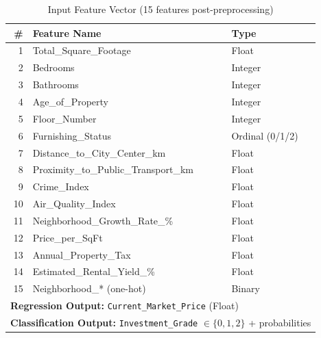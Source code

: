\documentclass[12pt,a4paper]{article}
\begin{document}
\begin{table}[H]
\centering
\caption{Input Feature Vector (15 features post-preprocessing)}
\begin{tabular}{@{} r l l @{}}
\toprule
\textbf{\#} & \textbf{Feature Name} & \textbf{Type} \\
\midrule
1  & Total\_Square\_Footage               & Float \\
2  & Bedrooms                             & Integer \\
3  & Bathrooms                            & Integer \\
4  & Age\_of\_Property                    & Integer \\
5  & Floor\_Number                        & Integer \\
6  & Furnishing\_Status                   & Ordinal (0/1/2) \\
7  & Distance\_to\_City\_Center\_km       & Float \\
8  & Proximity\_to\_Public\_Transport\_km & Float \\
9  & Crime\_Index                         & Float \\
10 & Air\_Quality\_Index                  & Float \\
11 & Neighborhood\_Growth\_Rate\_\%       & Float \\
12 & Price\_per\_SqFt                     & Float \\
13 & Annual\_Property\_Tax                & Float \\
14 & Estimated\_Rental\_Yield\_\%         & Float \\
15 & Neighborhood\_* (one-hot)            & Binary \\
\midrule
\multicolumn{3}{l}{\textbf{Regression Output:} \texttt{Current\_Market\_Price} (Float)} \\
\multicolumn{3}{l}{\textbf{Classification Output:}
  \texttt{Investment\_Grade} $\in \{0,1,2\}$ + probabilities} \\
\bottomrule
\end{tabular}
\end{table}
\end{document}
